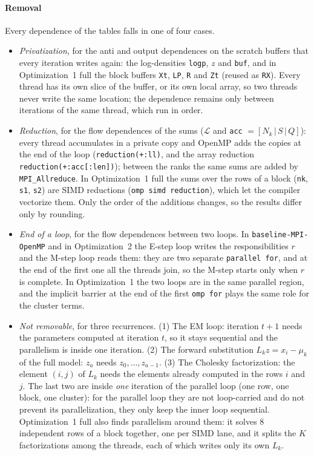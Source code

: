 \documentclass[conference,onecolumn]{IEEEtran}
\newcommand{\vbase}{\texttt{baseline-\allowbreak MPI-\allowbreak OpenMP}}
\begin{document}
\paragraph{Removal} Every dependence of the tables falls in one of four cases.
\begin{itemize}
\item \emph{Privatization}, for the anti and output dependences on the scratch buffers that every iteration writes again: the log-densities \texttt{logp}, $z$ and \texttt{buf}, and in Optimization~1 full the block buffers \texttt{Xt}, \texttt{LP}, \texttt{R} and \texttt{Zt} (reused as \texttt{RX}). Every thread has its own slice of the buffer, or its own local array, so two threads never write the same location; the dependence remains only between iterations of the same thread, which run in order.
\item \emph{Reduction}, for the flow dependences of the sums ($\mathcal{L}$ and \texttt{acc} $=[N_k\,|\,S\,|\,Q]$): every thread accumulates in a private copy and OpenMP adds the copies at the end of the loop (\texttt{reduction(+:ll)}, and the array reduction \texttt{reduction(+:acc[:len])}); between the ranks the same sums are added by \texttt{MPI\_Allreduce}. In Optimization~1 full the sums over the rows of a block (\texttt{nk}, \texttt{s1}, \texttt{s2}) are SIMD reductions (\texttt{omp simd reduction}), which let the compiler vectorize them. Only the order of the additions changes, so the results differ only by rounding.
\item \emph{End of a loop}, for the flow dependences between two loops. In \vbase{} and in Optimization~2 the E-step loop writes the responsibilities $r$ and the M-step loop reads them: they are two separate \texttt{parallel for}, and at the end of the first one all the threads join, so the M-step starts only when $r$ is complete. In Optimization~1 the two loops are in the same parallel region, and the implicit barrier at the end of the first \texttt{omp for} plays the same role for the cluster terms.
\item \emph{Not removable}, for three recurrences. (1) The EM loop: iteration $t+1$ needs the parameters computed at iteration $t$, so it stays sequential and the parallelism is inside one iteration. (2) The forward substitution $L_kz=x_i-\mu_k$ of the full model: $z_a$ needs $z_0,\dots,z_{a-1}$. (3) The Cholesky factorization: the element $(i,j)$ of $L_k$ needs the elements already computed in the rows $i$ and $j$. The last two are inside \emph{one} iteration of the parallel loop (one row, one block, one cluster): for the parallel loop they are not loop-carried and do not prevent its parallelization, they only keep the inner loop sequential. Optimization~1 full also finds parallelism around them: it solves 8 independent rows of a block together, one per SIMD lane, and it splits the $K$ factorizations among the threads, each of which writes only its own $L_k$.
\end{itemize}
\end{document}
